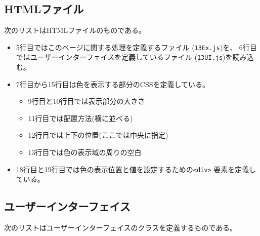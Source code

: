 \subsection{HTMLファイル}
次のリストはHTMLファイルのものである。
\begin{itemize}
 \item 5行目ではこのページに関する処理を定義する\JS ファイル
       (\texttt{13Ex.js})を、
			 6行目ではユーザーインターフェイスを定義している\JS ファイル
       (\texttt{13UI.js})を読み込む。
 \item 7行目から15行目は色を表示する部分のCSSを定義している。
       \begin{itemize}
        \item 9行目と10行目では表示部分の大きさ
        \item 11行目では配置方法(横に並べる)
        \item 12行目では上下の位置(ここでは中央に指定)
        \item 13行目では色の表示域の周りの空白
       \end{itemize}
 \item 18行目と19行目では色の表示位置と値を設定するための\texttt{<div>}
       要素を定義している。
\end{itemize}
 \subsection{ユーザーインターフェイス}
 次のリストはユーザーインターフェイスのクラスを定義するものである。

